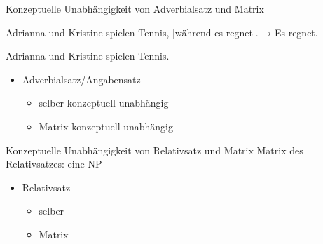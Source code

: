 \begin{frame}
  {Konzeptuelle Unabhängigkeit von Adverbialsatz und Matrix}
  \pause
  \begin{exe}
    \ex
    \begin{xlist}
      \ex Adrianna und Kristine spielen Tennis, [während es regnet].
      \pause
      \ex → Es regnet.
    \end{xlist}
    \pause
    \ex Adrianna und Kristine spielen Tennis.
  \end{exe}
  \pause\Halbzeile
  \begin{itemize}[<+->]
    \item Adverbialsatz\slash Angabensatz
      \begin{itemize}[<+->]
        \item selber \alert{konzeptuell unabhängig}
        \item Matrix \alert{konzeptuell unabhängig}
      \end{itemize}
  \end{itemize}
\end{frame}


\begin{frame}
  {Konzeptuelle Unabhängigkeit von Relativsatz und Matrix}
  \pause
  Matrix des Relativsatzes: eine \alert{NP}
  \pause
  \Halbzeile
  \begin{exe}
    \ex
    \begin{xlist}
        \pause
      \pause
    \end{xlist}
    \pause
    \ex {}
  \end{exe}
  \pause\Halbzeile
  \begin{itemize}[<+->]
    \item Relativsatz
      \begin{itemize}[<+->]
        \item selber 
        \item Matrix 
      \end{itemize}
  \end{itemize}
\end{frame}

